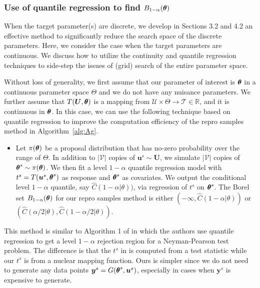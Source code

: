 \documentclass[12pt]{article}
\theoremstyle{shortspace}
\def\*#1{\bm{#1}}
\def\btheta{\mathop{\theta\kern-.45em\hbox{$\theta$}}\nolimits}
\newcommand{\RR}{\mathbb{R}}
\begin{document}
\subsubsection{ Use of quantile regression to find $B_{1 -\alpha}(\btheta)$}
\label{sec:quantile}



When the target parameter(s) are discrete, we develop in Sections 3.2 and 4.2 an effective method to significantly reduce the search space of the discrete parameters. Here, we consider the case when the target parameters are continuous. We discuss how to utilize the continuity and quantile regression techniques to side-step the issues of (grid) search of the entire parameter space. 

 Without loss of generality, we first assume that our parameter of interest is $\btheta$ in a continuous parameter space $\Theta$ and we do not have any nuisance
 parameters. 
We further assume that 
$T(\*U, \btheta)$ is a mapping from 
${\mathcal U} \times \Theta \to {\mathcal T} \in \RR$,
and it is continuous in $\btheta$. In this case, we can use the following technique based on quantile regression to improve the computation efficiency of the repro samples method in Algorithm~\ref{alg:Ag}.  
\begin{itemize}
[leftmargin=1.5em, labelsep=0em, 
align=parleft,   itemsep=0pt,
  parsep=0pt,
  topsep=1pt] 
    \item 
Let $\pi(\btheta)$ be a proposal distribution that has no-zero probability over the range of $\Theta$. In addition to $|{\mathcal V}|$ copies of $\*u^s \sim \*U$, we  simulate $|{\mathcal V}|$ copies of $\btheta^s \sim \pi(\btheta)$. We then fit a level $1 - \alpha$ quantile regression model with $t^s = T(\*u^s, {\btheta}^s)$ as response and ${\btheta^s}$ as covariates. We output the conditional level $1 - \alpha$ quantile, say $\widehat C(1-\alpha|\theta))$,  
via regression of $t^s$ on $\btheta^s$. 
The Borel set $B_{1 -\alpha}(\btheta)$ for our repro samples method is either $(-\infty, \widehat C(1-\alpha|\theta))$ or $(\widehat C(\alpha/2|\theta), \widehat C(1 - \alpha/2|\theta))$. 
\end{itemize}
This method is similar to Algorithm 1 of \cite{dalmasso2022} in which the authors use quantile regression to get a level $1 - \alpha$ rejection region for a Neyman-Pearson test problem. The difference is that the $t^s$ in \cite{dalmasso2022} is computed from a test statistic while our $t^s$ is from a nuclear mapping function. Ours is simpler since we do not need to generate any data points $\*y^s= G(\btheta^s, \*u^s)$, especially in cases when $\*y^s$ is expensive to generate. 
\end{document}
